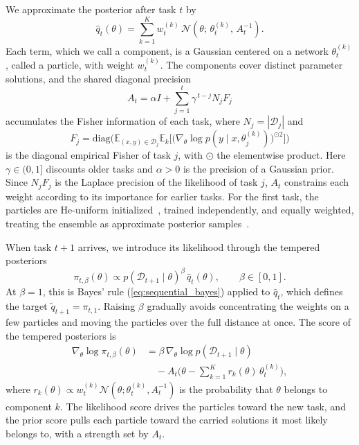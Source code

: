 We approximate the posterior after task $t$ by
\begin{equation}
    \hat q_t(\theta)=\sum_{k=1}^{K}w_t^{(k)}\,
    \mathcal{N}\!\left(\theta;\,\theta_t^{(k)},\,A_t^{-1}\right).
    \label{eq:mixture}
\end{equation}
Each term, which we call a component, is a Gaussian centered on a network
$\theta_t^{(k)}$, called a particle, with weight $w_t^{(k)}$. The components
cover distinct parameter solutions, and the shared diagonal precision
\begin{equation}
    A_t=\alpha I+\textstyle\sum_{j=1}^{t}\gamma^{\,t-j}N_jF_j
    \label{eq:precision}
\end{equation}
accumulates the Fisher information of each task, where $N_j=|\mathcal{D}_j|$ and
\begin{equation}
    F_j=\mathrm{diag}\Big(\mathbb{E}_{(x,y)\in\mathcal{D}_j}\mathbb{E}_{k}
    \big[\big(\nabla_\theta\log p(y\mid x,\theta_j^{(k)})\big)^{\odot2}\big]\Big)
    \label{eq:fisher}
\end{equation}
is the diagonal empirical Fisher of task $j$, with $\odot$ the elementwise
product. Here $\gamma\in(0,1]$ discounts older tasks and $\alpha>0$ is the
precision of a Gaussian prior. Since $N_jF_j$ is the Laplace precision of the
likelihood of task $j$, $A_t$ constrains each weight according to its importance
for earlier tasks. For the first task, the particles are He-uniform
initialized~\cite{he2015delving}, trained independently, and equally weighted,
treating the ensemble as approximate posterior
samples~\cite{lakshminarayanan2017ensembles,wilson2020bayesian}.

When task $t+1$ arrives, we introduce its likelihood through the tempered
posteriors
\begin{equation}
    \pi_{t,\beta}(\theta)\propto p(\mathcal{D}_{t+1}\mid\theta)^{\beta}\,
    \hat q_t(\theta),\qquad \beta\in[0,1].
    \label{eq:tempered}
\end{equation}
At $\beta=1$, this is Bayes' rule (\ref{eq:sequential_bayes}) applied to
$\hat q_t$, which defines the target $\tilde q_{t+1}=\pi_{t,1}$. Raising $\beta$
gradually avoids concentrating the weights on a few particles and moving the
particles over the full distance at once. The score of the tempered posteriors is
\begin{equation}
\begin{split}
    \nabla_\theta\log\pi_{t,\beta}(\theta)
    &= \beta\,\nabla_\theta\log p(\mathcal{D}_{t+1}\mid\theta)\\
    &\quad -A_t\Big(\theta-\textstyle\sum_{k=1}^{K}r_k(\theta)\,\theta_t^{(k)}\Big),
\end{split}
\label{eq:pathscore}
\end{equation}
where $r_k(\theta)\propto w_t^{(k)}\mathcal{N}(\theta;\theta_t^{(k)},A_t^{-1})$
is the probability that $\theta$ belongs to component $k$. The likelihood score
drives the particles toward the new task, and the prior score pulls each particle
toward the carried solutions it most likely belongs to, with a strength set by
$A_t$.


